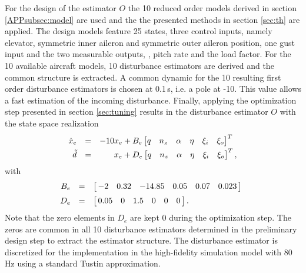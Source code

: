 \documentclass[graybox]{svmult}
\begin{document}
For the design of the estimator $O$  the 10 reduced order models derived in section \ref{APPsubsec:model} are used 
and the the presented methods in section \ref{sec:th} are applied. The  design models  feature 25 states, three control inputs, namely elevator, symmetric inner aileron and symmetric outer aileron position, one gust input and the two measurable outputs, \ie,  pitch rate and the load factor. For the  10 available aircraft models, 10 disturbance estimators are derived and the common structure is extracted.
A common dynamic for the 10 resulting first order disturbance estimators is chosen at 0.1\,s, i.e. a pole at -10. This value allows a fast estimation of the incoming disturbance.
Finally, applying the optimization step presented in section \ref{sec:tuning}  results in the disturbance estimator $O$ with the state space realization
\begin{equation}\label{eq:obs}
	\begin{array}{rcr}
		\dot  x_e  &=& -10 x_e + B_e
		\begin{bmatrix}
			q & n_z & \alpha & \eta & \xi_i & \xi _o 
		\end{bmatrix}^T \,\,\, \vspace{+1mm} \\ 
		\tilde d &=&  x_e + 
		D_e
		\begin{bmatrix}
			q & n_z & \alpha & \eta & \xi_i & \xi _o 
		\end{bmatrix}^T,
	\end{array}
\end{equation}
with  
\begin{equation*}
\begin{array}{rcl}
B_e &=&
\begin{bmatrix}
  \, -2 &   0.32 &   -14.85 &   0.05 &   0.07 &  0.023 \,
\end{bmatrix}  \,\,\, \vspace{+2mm} \\
 D_e &=&
\begin{bmatrix}
  \, 0.05  &  0   &1.5 &0 &  0 &  0 \,
\end{bmatrix}. 
\end{array}
\end{equation*}
Note that the zero elements in $D_e$ are kept 0 during the  optimization step. The zeros are common in all 10 disturbance estimators determined in the preliminary design step to extract the estimator structure.
The disturbance estimator is discretized for the implementation in the high-fidelity simulation model with 80\,Hz using a standard Tustin approximation.
\end{document}
